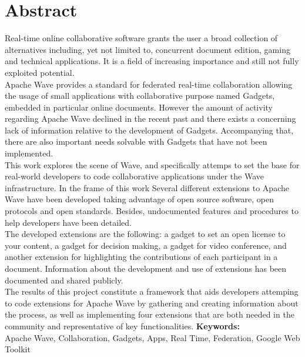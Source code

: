 \newpage
\renewcommand{\thepage}{\Roman{page}}
\setcounter{page}{9}
\chapter*{Abstract}
Real-time online collaborative software grants the user a broad collection of alternatives including, yet not limited to, concurrent document edition, gaming and technical applications. It is a field of increasing importance and still not fully exploited potential.\\[.2cm]
Apache Wave provides a standard for federated real-time collaboration allowing the usage of small applications with collaborative purpose named Gadgets, embedded in particular online documents. However the amount of activity regarding Apache Wave declined in the recent past and there exists a concerning lack of information relative to the development of Gadgets. Accompanying that, there are also important needs solvable with Gadgets that have not been implemented.\\[.2cm]
This work explores the scene of Wave, and specifically attemps to set the base for real-world developers to code collaborative applications under the Wave infrastructure. In the frame of this work Several different extensions to Apache Wave have been developed taking advantage of open source software, open protocols and open standards. Besides, undocumented features and procedures to help developers have been detailed.\\[.2cm]
The developed extensions are the following: a gadget to set an open license to your content, a gadget for decision making, a gadget for video conference, and another extension for highlighting the contributions of each participant in a document. Information about the development and use of extensions has been documented and shared publicly.\\[.2cm]
The results of this project constitute a framework that aids developers attemping to code extensions for Apache Wave by gathering and creating information about the process, as well as implementing four extensions that are both needed in the community and representative of key functionalities.
\vfill
{\large \bf Keywords:}\\
{\large Apache Wave, Collaboration, Gadgets, Apps, Real Time, Federation, Google Web Toolkit}

\newpage
\renewcommand{\thepage}{\Roman{page}}
\setcounter{page}{10}
